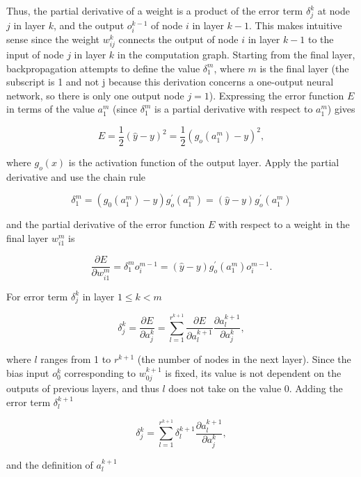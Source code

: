 \documentclass[main.tex]{subfiles}
\begin{document}
\begin{enumerate}
\begin{enumerate}
        Thus, the partial derivative of a weight is a product of the error term $\delta_j^k$ at node $j$ in layer $k$, and the output $o_i^{k-1}$ of node $i$ in layer $k-1$. This makes intuitive sense since the weight $w_{ij}^{k}$ connects the output of node $i$ in layer $k-1$ to the input of node $j$ in layer $k$ in the computation graph. Starting from the final layer, backpropagation attempts to define the value $\delta_{1}^{m}$, where $m$ is the final layer (the subscript is 1 and not j because this derivation concerns a one-output neural network, so there is only one output node $j=1$). Expressing the error function $E$ in terms of the value $a_1^m$ (since $\delta_1^m$ is a partial derivative with respect to $a_1^m$) gives 
        
        $$E=\frac{1}{2}(\hat{y}-y)^{2}=\frac{1}{2}\left(g_{o}\left(a_{1}^{m}\right)-y\right)^{2},$$
        
        where $g_{o}(x)$ is the activation function of the output layer. Apply the partial derivative and use the chain rule 
        
        $$\delta_{1}^{m}=\left(g_{0}\left(a_{1}^{m}\right)-y\right) g_{o}^{\prime}\left(a_{1}^{m}\right)=(\hat{y}-y) g_{o}^{\prime}\left(a_{1}^{m}\right)$$
        
        and the partial derivative of the error function $E$ with respect to a weight in the final layer $w_{i1}^m$ is 
        
        $$\frac{\partial E}{\partial w_{i 1}^{m}}=\delta_{1}^{m} o_{i}^{m-1}=(\hat{y}-y) g_{o}^{\prime}\left(a_{1}^{m}\right) o_{i}^{m-1}.$$
    
        For error term $\delta_j^k$ in layer $1 \leq k<m$
        
        $$\delta_{j}^{k}=\frac{\partial E}{\partial a_{j}^{k}}=\sum_{l=1}^{r^{k+1}} \frac{\partial E}{\partial a_{l}^{k+1}} \frac{\partial a_{l}^{k+1}}{\partial a_{j}^{k}},$$
        
        where $l$ ranges from 1 to $r^{k+1}$ (the number of nodes in the next layer). Since the bias input $o_0^k$ corresponding to $w_{0j}^{k+1}$ is fixed, its value is not dependent on the outputs of previous layers, and thus $l$ does not take on the value $0$. Adding the error term $\delta_l^{k+1}$
        
        $$\delta_{j}^{k}=\sum_{l=1}^{r^{k+1}} \delta_{l}^{k+1} \frac{\partial a_{l}^{k+1}}{\partial a_{j}^{k}},$$
        
        and the definition of $a_l^{k+1}$
        

\end{enumerate}
\end{enumerate}
\end{document}
